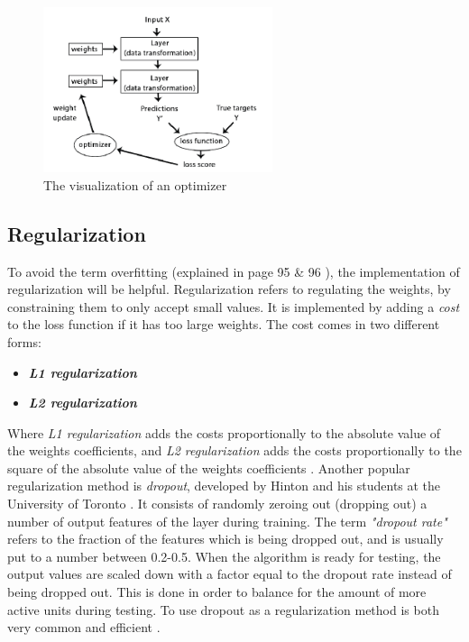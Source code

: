 \documentclass[USenglish]{ifimaster}  %
\begin{document}
\begin{figure}[H]
    \centering
    \includegraphics[width=0.6\textwidth]{bilder/optimizers.png}
    \caption{The visualization of an optimizer \cite{Francois_Deep_learning_with_python}}
    \label{fig:optimizers}
\end{figure}


\subsection{Regularization}
To avoid the term overfitting (explained in page 95 \& 96 \cite{Francois_Deep_learning_with_python}), the implementation of regularization will be helpful. Regularization refers to regulating the weights, by constraining them to only accept small values. It is implemented by adding a \textit{cost} to the loss function if it has too large weights. The cost comes in two different forms:

\begin{itemize}
    \item \textit{\textbf{L1 regularization}}
    \item \textit{\textbf{L2 regularization}}
\end{itemize}
Where \textit{L1 regularization} adds the costs proportionally to the absolute value of the weights coefficients, and \textit{L2 regularization} adds the costs proportionally to the square of the absolute value of the weights coefficients \cite{Francois_Deep_learning_with_python}. 
\newline
\newline
Another popular regularization method is \textit{dropout}, developed by Hinton and his students at the University of Toronto \cite{website:dropout}. It consists of randomly zeroing out (dropping out) a number of output features of the layer during training. The term \textit{"dropout rate"} refers to the fraction of the features which is being dropped out, and is usually put to a number between 0.2-0.5. When the algorithm is ready for testing, the output values are scaled down with a factor equal to the dropout rate instead of being dropped out. This is done in order to balance for the amount of more active units during testing. To use dropout as a regularization method is both very common and efficient \cite{Francois_Deep_learning_with_python}.   
\end{document}
